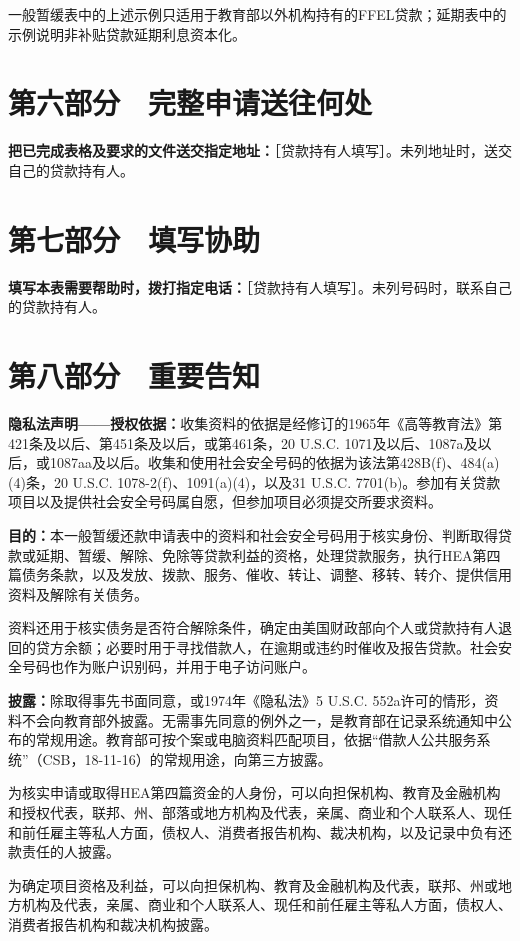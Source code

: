 \documentclass[UTF8,fontset=none,11pt,a4paper]{ctexart}
\begin{document}
一般暂缓表中的上述示例只适用于教育部以外机构持有的FFEL贷款；延期表中的示例说明非补贴贷款延期利息资本化。


\section*{第六部分　完整申请送往何处}
\textbf{把已完成表格及要求的文件送交指定地址：}［贷款持有人填写］。未列地址时，送交自己的贷款持有人。


\section*{第七部分　填写协助}
\textbf{填写本表需要帮助时，拨打指定电话：}［贷款持有人填写］。未列号码时，联系自己的贷款持有人。


\section*{第八部分　重要告知}
\textbf{隐私法声明——授权依据：}收集资料的依据是经修订的1965年《高等教育法》第421条及以后、第451条及以后，或第461条，20 U.S.C. 1071及以后、1087a及以后，或1087aa及以后。收集和使用社会安全号码的依据为该法第428B(f)、484(a)(4)条，20 U.S.C. 1078-2(f)、1091(a)(4)，以及31 U.S.C. 7701(b)。参加有关贷款项目以及提供社会安全号码属自愿，但参加项目必须提交所要求资料。


\textbf{目的：}本一般暂缓还款申请表中的资料和社会安全号码用于核实身份、判断取得贷款或延期、暂缓、解除、免除等贷款利益的资格，处理贷款服务，执行HEA第四篇债务条款，以及发放、拨款、服务、催收、转让、调整、移转、转介、提供信用资料及解除有关债务。


资料还用于核实债务是否符合解除条件，确定由美国财政部向个人或贷款持有人退回的贷方余额；必要时用于寻找借款人，在逾期或违约时催收及报告贷款。社会安全号码也作为账户识别码，并用于电子访问账户。


\textbf{披露：}除取得事先书面同意，或1974年《隐私法》5 U.S.C. 552a许可的情形，资料不会向教育部外披露。无需事先同意的例外之一，是教育部在记录系统通知中公布的常规用途。教育部可按个案或电脑资料匹配项目，依据“借款人公共服务系统”（CSB，18-11-16）的常规用途，向第三方披露。


为核实申请或取得HEA第四篇资金的人身份，可以向担保机构、教育及金融机构和授权代表，联邦、州、部落或地方机构及代表，亲属、商业和个人联系人、现任和前任雇主等私人方面，债权人、消费者报告机构、裁决机构，以及记录中负有还款责任的人披露。


为确定项目资格及利益，可以向担保机构、教育及金融机构及代表，联邦、州或地方机构及代表，亲属、商业和个人联系人、现任和前任雇主等私人方面，债权人、消费者报告机构和裁决机构披露。
\end{document}
